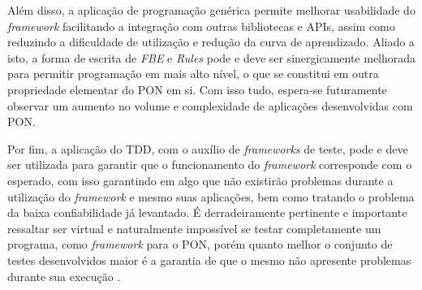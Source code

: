 Além disso, a aplicação de programação genérica permite melhorar usabilidade do
\textit{framework} facilitando a integração com outras bibliotecas e APIs, assim
como reduzindo a dificuldade de utilização e redução da curva de aprendizado.
Aliado a isto, a forma de escrita de \textit{FBE} e \textit{Rules} pode e deve
ser sinergicamente melhorada para permitir programação em mais alto nível, o que
se constitui em outra propriedade elementar do PON em si. Com isso tudo, espera-se
futuramente observar um aumento no volume e complexidade de aplicações
desenvolvidas com PON.

Por fim, a aplicação do TDD, com o auxílio de \textit{frameworks} de teste, pode
e deve ser utilizada para garantir que o funcionamento do \textit{framework}
corresponde com o esperado, com isso garantindo em algo que não existirão
problemas durante a utilização do \textit{framework} e mesmo suas aplicações,
bem como tratando o problema da baixa confiabilidade já levantado. É
derradeiramente pertinente e importante ressaltar ser virtual e naturalmente
impossível se testar completamente um programa, como \textit{framework} para o
PON, porém quanto melhor o conjunto de testes desenvolvidos maior é a garantia
de que o mesmo não apresente problemas durante sua execução \cite{testing_2008}.
